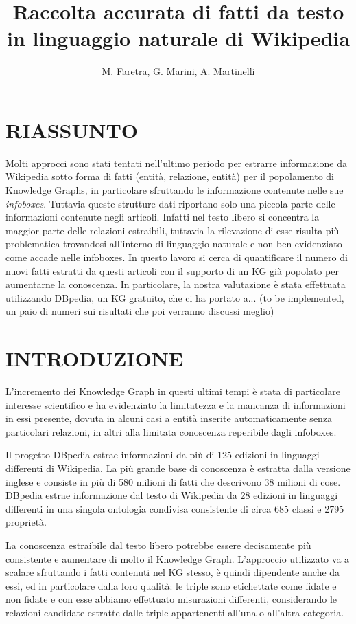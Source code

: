 \documentclass[10pt,a4paper,twocolumn]{article}
\author{M. Faretra, G. Marini, A. Martinelli}
\title{\textbf{Raccolta accurata di fatti da testo in linguaggio naturale di Wikipedia}}
\begin{document}
	
\maketitle
		
\section*{RIASSUNTO}
		
Molti approcci sono stati tentati nell'ultimo periodo per estrarre informazione da Wikipedia sotto forma di fatti (entità, relazione, entità) per il popolamento di Knowledge Graphs, in particolare sfruttando le informazione contenute nelle sue \textit{infoboxes}. Tuttavia queste strutture dati riportano solo una piccola parte delle informazioni contenute negli articoli. Infatti nel testo libero si concentra la maggior parte delle relazioni estraibili, tuttavia la rilevazione di esse risulta più problematica trovandosi all'interno di linguaggio naturale e non ben evidenziato come accade nelle infoboxes. In questo lavoro si cerca di quantificare il numero di nuovi fatti estratti da questi articoli con il supporto di un KG già popolato per aumentarne la conoscenza. In particolare, la nostra valutazione è stata effettuata utilizzando DBpedia, un KG gratuito, che ci ha portato a... (to be implemented, un paio di numeri sui risultati che poi verranno discussi meglio)

\section{INTRODUZIONE} 

L'incremento dei Knowledge Graph in questi ultimi tempi è stata di particolare interesse scientifico e ha evidenziato la limitatezza e la mancanza di informazioni in essi presente, dovuta in alcuni casi a entità inserite automaticamente senza particolari relazioni, in altri alla limitata conoscenza reperibile dagli infoboxes.

Il progetto DBpedia estrae informazioni da più di 125 edizioni in linguaggi differenti di Wikipedia. La più grande base di conoscenza è estratta dalla versione inglese e consiste in più di 580 milioni di fatti che descrivono 38 milioni di cose. DBpedia estrae informazione dal testo di  Wikipedia da 28 edizioni in linguaggi differenti in una singola ontologia condivisa consistente di circa 685 classi e 2795 proprietà. 

La conoscenza estraibile dal testo libero potrebbe essere decisamente più consistente e aumentare di molto il Knowledge Graph. L'approccio utilizzato va a scalare sfruttando i fatti contenuti nel KG stesso, è quindi dipendente anche da essi, ed in particolare dalla loro qualità: le triple sono etichettate come fidate e non fidate e con esse abbiamo effettuato misurazioni differenti, considerando le relazioni candidate estratte dalle triple appartenenti all'una o all'altra categoria.
\end{document}
